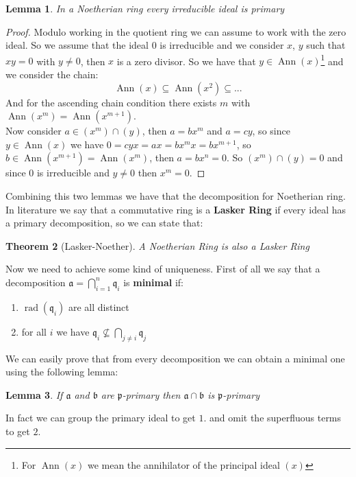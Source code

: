 \documentclass[notitlepage, a4]{book}
\theoremstyle{plain}
\newtheorem{teo}{Theorem}[section]
\newtheorem{lem}[teo]{Lemma}
\theoremstyle{remark}
\theoremstyle{definition}
\newcommand{\p}{\mathfrak{p}}
\newcommand{\q}{\mathfrak{q}}
\newcommand{\A}{\mathfrak{a}}
\newcommand{\B}{\mathfrak{b}}
\DeclareMathOperator{\rad}{rad}
\DeclareMathOperator{\Ann}{Ann}
\newcounter{que}
\begin{document}
\begin{lem}
	In a Noetherian ring every irreducible ideal is primary
\end{lem}

\begin{proof}
Modulo working in the quotient ring we can assume to work with the zero ideal. So we assume that the ideal $ 0 $ is irreducible and we consider $ x$, $y $ such that $ xy = 0 $ with $ y\neq 0 $, then $ x $ is a zero divisor. So we have that $ y \in \Ann(x) $\footnote{For $ \Ann(x) $ we mean the annihilator of the principal ideal $ (x) $} and we consider the chain:
$$ \Ann(x)  \subseteq \Ann(x^2) \subseteq ...$$
And for the ascending chain condition there exists $ m $ with $ \Ann(x^m)= \Ann(x^{m+1})$. \\
Now consider $ a \in (x^m)\cap (y) $, then $ a = bx^m $ and $ a = cy $, so since $ y \in \Ann(x) $ we have $ 0 = cyx = ax = bx^m x=  bx^{m+1}$, so $ b \in  \Ann(x^{m+1}) = \Ann(x^m) $, then $ a = bx^n = 0 $. So $ (x^m)\cap (y)=0 $ and since $ 0 $ is irreducible and $ y\neq 0 $ then $ x^m=0 $. 
\end{proof}

Combining this two lemmas we have that the decomposition for Noetherian ring. In literature we say that a commutative ring is a \textbf{Lasker Ring} if every ideal has a primary decomposition, so we can state that:

\begin{teo}[Lasker-Noether]
A Noetherian Ring is also a Lasker Ring
\end{teo}
Now we need to achieve some kind of uniqueness. First of all we say that a decomposition $ \A = \bigcap_{i=1}^n \q_i $ is \textbf{minimal} if:
\begin{enumerate}
\item $ \rad(\q_i) $ are all distinct
\item for all $ i $ we have $ \q_i \not \subseteq \bigcap_{j\neq i} \q_j $
\end{enumerate}

We can easily prove that from every decomposition we can obtain a minimal one using the following lemma:

\begin{lem}
If $ \A $ and $ \B $ are $ \p $-primary then $ \A \cap \B $ is $ \p $-primary
\end{lem}

In fact we can group the primary ideal to get $ 1. $ and omit the superfluous terms to get $ 2. $
\end{document}
